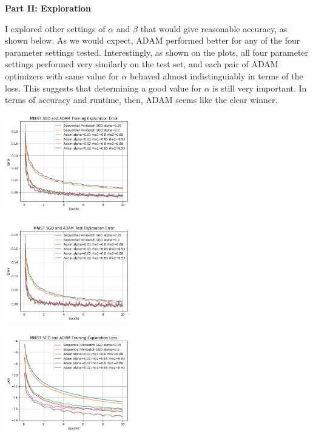 \documentclass[10pt]{article}
\begin{document}
\begin{multicols}{2}
\begin{center}
\end{center}
\noindent
\textbf{Part II: Exploration} \par
I explored other settings of $\alpha$ and $\beta$ that would give reasonable accuracy, as shown below. As we would expect, ADAM performed better for any of the four parameter settings tested. Interestingly, as shown on the plots, all four parameter settings performed very similarly on the test set, and each pair of ADAM optimizers with same value for $\alpha$ behaved almost indistinguiably in terms of the loss. This suggests that determining a good value for $\alpha $ is still very important. In terms of accuracy and runtime, then, ADAM seems like the clear winner.\par

\begin{center}
    \includegraphics[width=0.41\textwidth]{SGDandADAMTrainingExplorationError.png}
\end{center}
\begin{center}
    \includegraphics[width=0.41\textwidth]{SGDandADAMTestExplorationError.png}
\end{center}
\begin{center}
    \includegraphics[width=0.41\textwidth]{SGDandADAMTrainingExplorationLoss.png}
\end{center}
\end{multicols}
\end{document}
